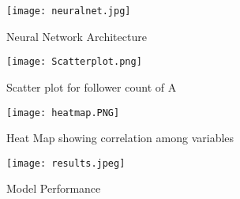 \documentclass[sigconf]{acmart}
\begin{document}
\begin{figure}[htp]
    \texttt{[image: neuralnet.jpg]}
    \caption{Neural Network Architecture \cite{google1}}
    \label{fig:figure2}
\end{figure}

\begin{figure}[htp]
    \texttt{[image: Scatterplot.png]}
    \caption{Scatter plot for follower count of A }
    \label{fig:figure 3}
\end{figure}

\begin{figure}[htp]
    \texttt{[image: heatmap.PNG]}
    \caption{Heat Map showing correlation among variables}
    \label{fig:figure4}
\end{figure}



\begin{figure}[htp]
    \texttt{[image: results.jpeg]}
    \caption{Model Performance}
    \label{fig:figure 5}
\end{figure}
\end{document}
